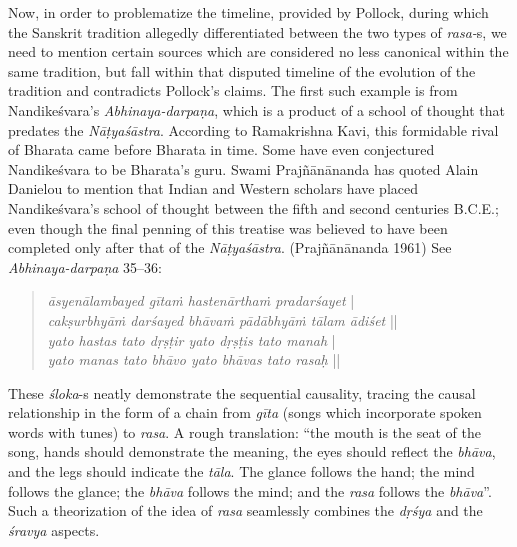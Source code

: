 Now, in order to problematize the timeline, provided by Pollock, during which the Sanskrit tradition allegedly differentiated between the two types of \textsl{rasa-}s, we need to mention certain sources which are considered no less canonical within the same tradition, but fall within that disputed timeline of the evolution of the tradition and contradicts Pollock’s claims. The first such example is from Nandikeśvara’s \textsl{Abhinaya-darpaṇa}, which is a product of a school of thought that predates the \textsl{Nāṭyaśāstra}. According to Ramakrishna Kavi, this formidable rival of Bharata came before Bharata in time. Some have even conjectured Nandikeśvara to be Bharata’s guru. Swami Prajñānānanda has quoted Alain Danielou to mention that Indian and Western scholars have placed Nandikeśvara’s school of thought between the fifth and second centuries B.C.E.; even though the final penning of this treatise was believed to have been completed only after that of the \textsl{Nāṭyaśāstra}. (Prajñānānanda 1961) See \textsl{Abhinaya-darpaṇa} 35--36:
\begin{quote}
\textsl{āsyenālambayed gītaṁ hastenārthaṁ pradarśayet} |  \\
\textsl{cakṣurbhyāṁ darśayed bhāvaṁ pādābhyāṁ tālam ādiśet} ||   \\
\textsl{yato hastas tato dṛṣṭir yato dṛṣṭis tato manah} | \\
\textsl{yato manas tato bhāvo yato bhāvas tato rasaḥ} || 
\end{quote}

These \textsl{śloka}-s neatly demonstrate the sequential causality, tracing the causal relationship in the form of a chain from \textsl{gīta} (songs which incorporate spoken words with tunes) to \textsl{rasa}. A rough translation: “the mouth is the seat of the song, hands should demonstrate the meaning, the eyes should reflect the \textsl{bhāva}, and the legs should indicate the \textsl{tāla}. The glance follows the hand; the mind follows the glance; the \textsl{bhāva} follows the mind; and the \textsl{rasa} follows the \textsl{bhāva}''. Such a theorization of the idea of \textsl{rasa} seamlessly combines the \textsl{dṛśya} and the \textsl{śravya} aspects. 


